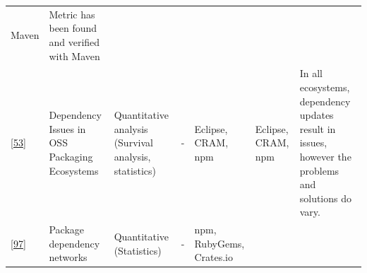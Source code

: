 \documentclass[]{book}
\begin{document}
\begin{longtable}[]{@{}lllllll@{}}
\begin{minipage}[t]{0.12\columnwidth}
Maven\strut
\end{minipage} & \begin{minipage}[t]{0.10\columnwidth}\raggedright\strut
Metric has been found and verified with Maven\strut
\end{minipage}\tabularnewline
\begin{minipage}[t]{0.09\columnwidth}\raggedright\strut
{[}\protect\hyperlink{ref-Decan2017}{53}{]}\strut
\end{minipage} & \begin{minipage}[t]{0.16\columnwidth}\raggedright\strut
Dependency Issues in OSS Packaging Ecosystems\strut
\end{minipage} & \begin{minipage}[t]{0.17\columnwidth}\raggedright\strut
Quantitative analysis (Survival analysis, statistics)\strut
\end{minipage} & \begin{minipage}[t]{0.07\columnwidth}\raggedright\strut
-\strut
\end{minipage} & \begin{minipage}[t]{0.10\columnwidth}\raggedright\strut
Eclipse, CRAM, npm\strut
\end{minipage} & \begin{minipage}[t]{0.12\columnwidth}\raggedright\strut
Eclipse, CRAM, npm\strut
\end{minipage} & \begin{minipage}[t]{0.10\columnwidth}\raggedright\strut
In all ecosystems, dependency updates result in issues, however the
problems and solutions do vary.\strut
\end{minipage}\tabularnewline
\begin{minipage}[t]{0.09\columnwidth}\raggedright\strut
{[}\protect\hyperlink{ref-Kikas2017}{97}{]}\strut
\end{minipage} & \begin{minipage}[t]{0.16\columnwidth}\raggedright\strut
Package dependency networks\strut
\end{minipage} & \begin{minipage}[t]{0.17\columnwidth}\raggedright\strut
Quantitative (Statistics)\strut
\end{minipage} & \begin{minipage}[t]{0.07\columnwidth}\raggedright\strut
-\strut
\end{minipage} & \begin{minipage}[t]{0.10\columnwidth}\raggedright\strut
npm, RubyGems, Crates.io\strut
\end{minipage} & \begin{minipage}[t]{0.12\columnwidth}\raggedright\strut

\end{minipage}
\end{longtable}
\end{document}
